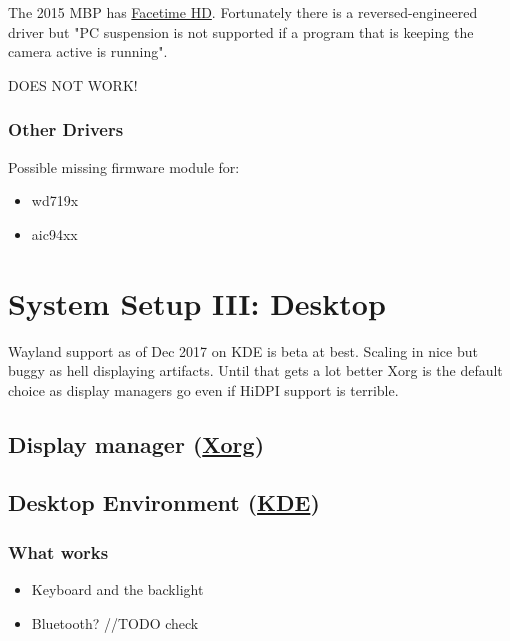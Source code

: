 The 2015 MBP has \href{https://wiki.archlinux.org/index.php/MacBook#Facetime_HD}{Facetime HD}.
Fortunately there is a reversed-engineered driver but "PC suspension is not supported if a 
program that is keeping the camera active is running".

DOES NOT WORK!


\subsubsection{Other Drivers}

Possible missing firmware module for:
\begin{itemize}[noitemsep,topsep=0pt,leftmargin=*]
    \item wd719x
    \item aic94xx
\end{itemize}


\section{System Setup III: Desktop}

Wayland support as of Dec 2017 on KDE is beta at best. Scaling in nice but buggy as hell displaying artifacts. Until that gets a lot better Xorg is the default choice as display managers go even if HiDPI support is terrible. 

\subsection{Display manager (\href{https://wiki.archlinux.org/index.php/xorg}{Xorg})}


\subsection{Desktop Environment (\href{https://wiki.archlinux.org/index.php/KDE}{KDE})}

\subsubsection{What works}

\begin{itemize}[noitemsep,topsep=0pt,leftmargin=*]
    \item Keyboard and the backlight
    \item Bluetooth? //TODO check
\end{itemize}

